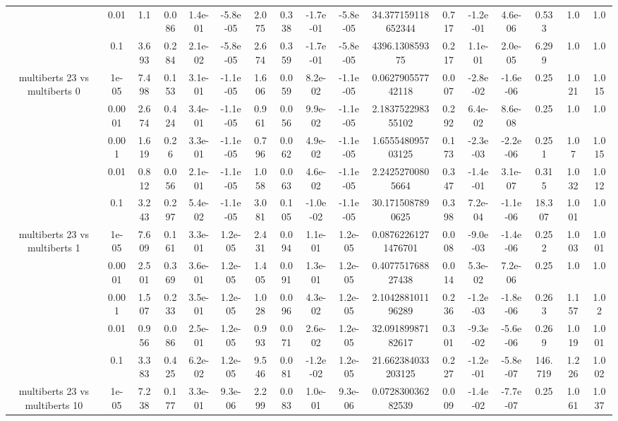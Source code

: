 \begin{tabular}{|c|c|c|c|c|c|c|c|c|c|c|c|c|c|c|c|c|}
 & 0.01 & 1.1 & 0.086 & 1.4e-01 & -5.8e-05 & 2.075 & 0.338 & -1.7e-01 & -5.8e-05 & 34.377159118652344 & 0.717 & -1.2e-01 & 4.6e-06 & 0.533 & 1.0 & 1.0 \\
 & 0.1 & 3.693 & 0.284 & 2.1e-02 & -5.8e-05 & 2.674 & 0.359 & -1.7e-01 & -5.8e-05 & 4396.130859375 & 0.217 & 1.1e-01 & 2.0e-05 & 6.299 & 1.0 & 1.0 \\
\hline
\multirow{5}{*}{multiberts 23 vs multiberts 0} & 1e-05 & 7.498 & 0.153 & 3.1e-01 & -1.1e-05 & 1.606 & 0.059 & 8.2e-02 & -1.1e-05 & 0.062790557742118 & 0.007 & -2.8e-02 & -1.6e-06 & 0.25 & 1.021 & 1.015 \\
 & 0.0001 & 2.674 & 0.424 & 3.4e-01 & -1.1e-05 & 0.961 & 0.056 & 9.9e-02 & -1.1e-05 & 2.183752298355102 & 0.292 & 6.4e-02 & 8.6e-08 & 0.25 & 1.0 & 1.0 \\
 & 0.001 & 1.619 & 0.26 & 3.3e-01 & -1.1e-05 & 0.796 & 0.062 & 4.9e-02 & -1.1e-05 & 1.655548095703125 & 0.173 & -2.3e-03 & -2.2e-06 & 0.251 & 1.07 & 1.015 \\
 & 0.01 & 0.812 & 0.056 & 2.1e-01 & -1.1e-05 & 1.058 & 0.063 & 4.6e-02 & -1.1e-05 & 2.24252700805664 & 0.347 & -1.4e-01 & 3.1e-07 & 0.315 & 1.032 & 1.012 \\
 & 0.1 & 3.243 & 0.297 & 5.4e-02 & -1.1e-05 & 3.081 & 0.105 & -1.0e-02 & -1.1e-05 & 30.1715087890625 & 0.398 & 7.2e-04 & -1.1e-06 & 18.307 & 1.001 & 1.0 \\
\hline
\multirow{5}{*}{multiberts 23 vs multiberts 1} & 1e-05 & 7.609 & 0.161 & 3.3e-01 & 1.2e-05 & 2.431 & 0.094 & 1.1e-01 & 1.2e-05 & 0.08762261271476701 & 0.008 & -9.0e-03 & -1.4e-06 & 0.252 & 1.003 & 1.001 \\
 & 0.0001 & 2.501 & 0.369 & 3.6e-01 & 1.2e-05 & 1.405 & 0.091 & 1.3e-01 & 1.2e-05 & 0.407751768827438 & 0.014 & 5.3e-02 & 7.2e-06 & 0.25 & 1.0 & 1.0 \\
 & 0.001 & 1.507 & 0.233 & 3.5e-01 & 1.2e-05 & 1.028 & 0.096 & 4.3e-02 & 1.2e-05 & 2.104288101196289 & 0.236 & -1.2e-03 & -1.8e-06 & 0.263 & 1.157 & 1.02 \\
 & 0.01 & 0.956 & 0.086 & 2.5e-01 & 1.2e-05 & 0.993 & 0.071 & 2.6e-02 & 1.2e-05 & 32.09189987182617 & 0.301 & -9.3e-02 & -5.6e-06 & 0.269 & 1.019 & 1.001 \\
 & 0.1 & 3.383 & 0.425 & 6.2e-02 & 1.2e-05 & 9.546 & 0.081 & -1.2e-02 & 1.2e-05 & 21.662384033203125 & 0.227 & -1.2e-01 & -5.8e-07 & 146.719 & 1.226 & 1.002 \\
\hline
\multirow{5}{*}{multiberts 23 vs multiberts 10} & 1e-05 & 7.238 & 0.177 & 3.3e-01 & 9.3e-06 & 2.299 & 0.083 & 1.0e-01 & 9.3e-06 & 0.072830036282539 & 0.009 & -1.4e-02 & -7.7e-07 & 0.25 & 1.061 & 1.037 \\

\end{tabular}
